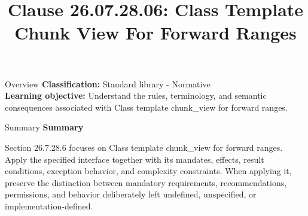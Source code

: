 \documentclass[10pt,letterpaper]{article}
\title{Clause 26.07.28.06: Class Template Chunk View For Forward Ranges}
\author{}
\date{}
\begin{document}
\maketitle
\begin{CornellOverviewBox}{Overview}
\textbf{Classification:} Standard library - Normative\\[2pt]
\textbf{Learning objective:} Understand the rules, terminology, and semantic consequences associated with Class template chunk\_view for forward ranges.
\end{CornellOverviewBox}\begin{CornellSummaryBox}{Summary}
{\sffamily\bfseries\color{Accent} Summary}\par\vspace{3pt}Section 26.7.28.6 focuses on Class template chunk\_view for forward ranges. Apply the specified interface together with its mandates, effects, result conditions, exception behavior, and complexity constraints. When applying it, preserve the distinction between mandatory requirements, recommendations, permissions, and behavior deliberately left undefined, unspecified, or implementation-defined.
\end{CornellSummaryBox}
\end{document}
